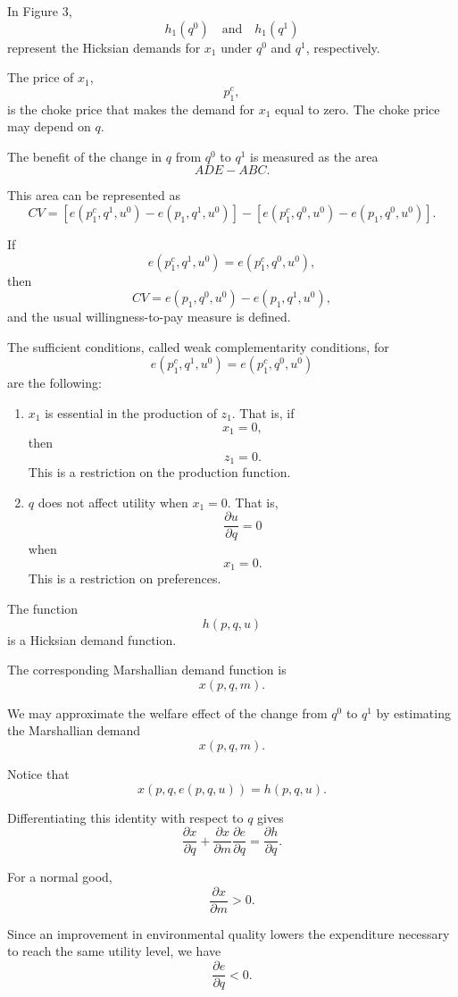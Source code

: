 In Figure 3,
\[
h_1(q^0)
\quad \text{and} \quad
h_1(q^1)
\]
represent the Hicksian demands for \(x_1\) under \(q^0\) and \(q^1\), respectively.

The price of \(x_1\),
\[
p_1^c,
\]
is the choke price that makes the demand for \(x_1\) equal to zero. The choke price may depend on \(q\).

The benefit of the change in \(q\) from \(q^0\) to \(q^1\) is measured as the area
\[
ADE-ABC.
\]

This area can be represented as
\[
CV
=
\left[
e(p_1^c,q^1,u^0)
-
e(p_1,q^1,u^0)
\right]
-
\left[
e(p_1^c,q^0,u^0)
-
e(p_1,q^0,u^0)
\right].
\]

If
\[
e(p_1^c,q^1,u^0)
=
e(p_1^c,q^0,u^0),
\]
then
\[
CV
=
e(p_1,q^0,u^0)
-
e(p_1,q^1,u^0),
\]
and the usual willingness-to-pay measure is defined.

The sufficient conditions, called weak complementarity conditions, for
\[
e(p_1^c,q^1,u^0)
=
e(p_1^c,q^0,u^0)
\]
are the following:

\begin{enumerate}
    \item \(x_1\) is essential in the production of \(z_1\). That is, if
    \[
    x_1=0,
    \]
    then
    \[
    z_1=0.
    \]
    This is a restriction on the production function.

    \item \(q\) does not affect utility when \(x_1=0\). That is,
    \[
    \frac{\partial u}{\partial q}=0
    \]
    when
    \[
    x_1=0.
    \]
    This is a restriction on preferences.
\end{enumerate}

The function
\[
h(p,q,u)
\]
is a Hicksian demand function.

The corresponding Marshallian demand function is
\[
x(p,q,m).
\]

We may approximate the welfare effect of the change from \(q^0\) to \(q^1\) by estimating the Marshallian demand
\[
x(p,q,m).
\]



Notice that
\[
x(p,q,e(p,q,u))=h(p,q,u).
\]

Differentiating this identity with respect to \(q\) gives
\[
\frac{\partial x}{\partial q}
+
\frac{\partial x}{\partial m}
\frac{\partial e}{\partial q}
=
\frac{\partial h}{\partial q}.
\]

For a normal good,
\[
\frac{\partial x}{\partial m}>0.
\]

Since an improvement in environmental quality lowers the expenditure necessary to reach the same utility level, we have
\[
\frac{\partial e}{\partial q}<0.
\]

